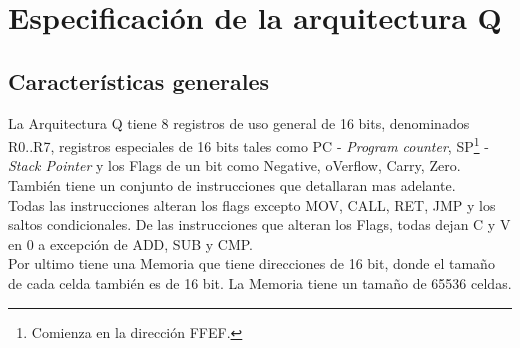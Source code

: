 \section{Especificación de la arquitectura Q}\label{apendiceQ}

\subsection{Características generales} 

La Arquitectura Q tiene 8 registros de uso general de 16 bits, denominados R0..R7, registros especiales de 16 bits tales como PC - \textit{Program counter}, SP\footnote{Comienza en la dirección FFEF.} - \textit{Stack Pointer} y los Flags de un bit como Negative, oVerflow, Carry, Zero. También tiene un conjunto de instrucciones que detallaran mas adelante. \\
Todas las instrucciones alteran los flags excepto MOV, CALL, RET, JMP y los saltos condicionales. De las instrucciones que alteran los Flags, todas dejan C y V en 0 a excepción de ADD, SUB y CMP.  \\


Por ultimo tiene una Memoria que tiene direcciones de 16 bit, donde el tamaño de cada celda también es de 16 bit. La Memoria tiene un tamaño de 65536 celdas. \\ 
